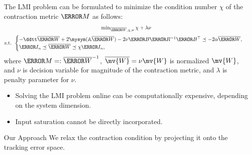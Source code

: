 \begin{frame}{\insertsubsectionhead}{}

  The LMI problem can be formulated to minimize the condition number $\chi$ of the contraction metric $\mm{M}$ as follows:
  \begin{equation} \label{eq:opt:conv:lmi}
    \begin{matrix}
      \min_{
        \overline{\mm{W}},\chi,\nu
        } 
      \chi + \lambda \nu
      \\ 
      \vspace{-.2cm}
      \\
      \text{s.t. }
      \begin{cases}
        -
        \ddtt\overline{\mm{W}}
        +
        2\mysym(
          \mathbb{A}\overline{\mm{W}}
        )
        -
        2\nu\mm{B}\mm{R}^{-1} \mm{B}^\top 
        \preceq
        -2\alpha\overline{\mm{W}}
        ,
        \\
        \mm{I}_n
        \preceq
        \overline{\mm{W}}
        \preceq
        \chi \mm{I}_n
        ,
      \end{cases}
    \end{matrix}
  \end{equation} 
  where $\mm{M}=:\overline{\mm{W}}^{-1}$, $\overline{\mv{W}} = \nu \mv{W}$ is normalized $\mv{W}$, and $\nu$ is decision variable for magnitude of the contraction metric, and $\lambda$ is penalty parameter for $\nu$.

  \begin{itemize}
    \item Solving the LMI problem online can be computationally expensive, depending on the system dimension.
    \item Input saturation cannot be directly incorporated.
  \end{itemize}
  
  \hfill

  \begin{block}{Our Approach}
    We relax the contraction condition by projecting it onto the tracking error space.
  \end{block}

\end{frame}
